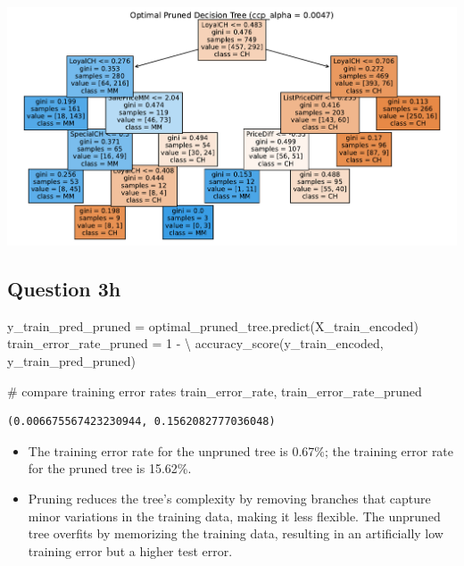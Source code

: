 \documentclass[
  letterpaper,
  DIV=11,
  numbers=noendperiod]{scrartcl}
\newenvironment{Shaded}{\begin{snugshade}}{\end{snugshade}}
\newcommand{\CommentTok}[1]{\textcolor[rgb]{0.37,0.37,0.37}{#1}}
\newcommand{\DecValTok}[1]{\textcolor[rgb]{0.68,0.00,0.00}{#1}}
\newcommand{\NormalTok}[1]{\textcolor[rgb]{0.00,0.23,0.31}{#1}}
\newcommand{\OperatorTok}[1]{\textcolor[rgb]{0.37,0.37,0.37}{#1}}
\providecommand{\tightlist}{%
  \setlength{\itemsep}{0pt}\setlength{\parskip}{0pt}}\usepackage{longtable,booktabs,array}
\begin{document}
\includegraphics{PS4_files/figure-pdf/cell-17-output-1.pdf}

\subsection{Question 3h}\label{question-3h}

\begin{Shaded}
\begin{Highlighting}[]
\NormalTok{y\_train\_pred\_pruned }\OperatorTok{=}\NormalTok{ optimal\_pruned\_tree.predict(X\_train\_encoded)}
\NormalTok{train\_error\_rate\_pruned }\OperatorTok{=} \DecValTok{1} \OperatorTok{{-}} \OperatorTok{\textbackslash{}}
\NormalTok{    accuracy\_score(y\_train\_encoded, y\_train\_pred\_pruned)}

\CommentTok{\# compare training error rates}
\NormalTok{train\_error\_rate, train\_error\_rate\_pruned}
\end{Highlighting}
\end{Shaded}

\begin{verbatim}
(0.006675567423230944, 0.1562082777036048)
\end{verbatim}

\begin{itemize}
\tightlist
\item
  The training error rate for the unpruned tree is 0.67\%; the training
  error rate for the pruned tree is 15.62\%.
\item
  Pruning reduces the tree's complexity by removing branches that
  capture minor variations in the training data, making it less
  flexible. The unpruned tree overfits by memorizing the training data,
  resulting in an artificially low training error but a higher test
  error. \hspace{0pt}\hspace{0pt}
\end{itemize}
\end{document}
